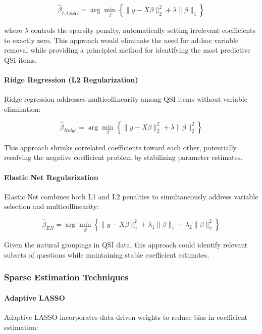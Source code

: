 \documentclass[12pt]{article}
\begin{document}
\begin{equation}
\hat{\beta}_{LASSO} = \arg\min_{\beta} \left\{ \|y - X\beta\|_2^2 + \lambda\|\beta\|_1 \right\}
\end{equation}

where $\lambda$ controls the sparsity penalty, automatically setting irrelevant coefficients to exactly zero. This approach would eliminate the need for ad-hoc variable removal while providing a principled method for identifying the most predictive QSI items.

\paragraph{Ridge Regression (L2 Regularization)}
Ridge regression addresses multicollinearity among QSI items without variable elimination:

\begin{equation}
\hat{\beta}_{Ridge} = \arg\min_{\beta} \left\{ \|y - X\beta\|_2^2 + \lambda\|\beta\|_2^2 \right\}
\end{equation}

This approach shrinks correlated coefficients toward each other, potentially resolving the negative coefficient problem by stabilizing parameter estimates.

\paragraph{Elastic Net Regularization}
Elastic Net combines both L1 and L2 penalties to simultaneously address variable selection and multicollinearity:

\begin{equation}
\hat{\beta}_{EN} = \arg\min_{\beta} \left\{ \|y - X\beta\|_2^2 + \lambda_1\|\beta\|_1 + \lambda_2\|\beta\|_2^2 \right\}
\end{equation}

Given the natural groupings in QSI data, this approach could identify relevant subsets of questions while maintaining stable coefficient estimates.

\subsubsection{Sparse Estimation Techniques}

\paragraph{Adaptive LASSO}
Adaptive LASSO incorporates data-driven weights to reduce bias in coefficient estimation:
\end{document}
